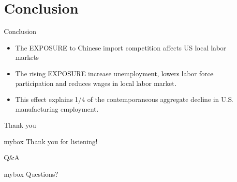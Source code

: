 \documentclass[10pt,aspectratio=43,mathserif,table]{beamer}
\begin{document}
\section{Conclusion}
\begin{frame}{Conclusion}  %
	\begin{itemize}
	\item<0->  The EXPOSURE to Chinese import competition affects US local labor markets
	\item<0->  The rising EXPOSURE increase unemployment, lowers labor force participation and reduces wages in local labor market.
	\item<0->  This effect explains 1/4 of the contemporaneous aggregate decline in U.S. manufacturing employment.
\end{itemize}
\end{frame}

\begin{frame}{Thank you}
\begin{center}
\begin{minipage}{1\textwidth}
 \begin{beamercolorbox}[wd=0.70\textwidth, rounded=true, shadow=true]{mybox}
\LARGE \centering Thank you for listening!  %
\end{beamercolorbox}
 \end{minipage}
\end{center}
\end{frame}

\begin{frame}{Q\&A}
\begin{center}
	\begin{minipage}{1\textwidth}
		\begin{beamercolorbox}[wd=0.70\textwidth, rounded=true, shadow=true]{mybox}
			\LARGE \centering  Questions?  %
		\end{beamercolorbox}
	\end{minipage}
\end{center}
\end{frame}

\end{document}
